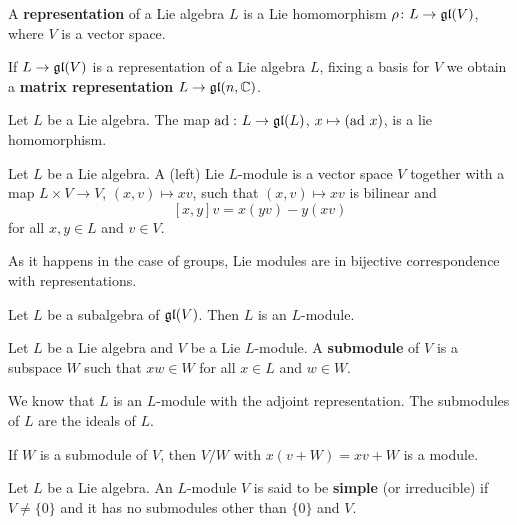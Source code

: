 
\begin{definition}
    A \textbf{representation} of a Lie algebra $L$ 
    is a Lie homomorphism $\rho\colon L\to\mathfrak{gl}(V)$, where $V$ is a vector space. 
\end{definition}

If $L\to\mathfrak{gl}(V)$ is a representation of a Lie algebra $L$, 
fixing a basis for $V$ 
we obtain a \textbf{matrix representation}
$L\to\mathfrak{gl}(n,\mathbb{C})$. 

\begin{example}
    Let $L$ be a Lie algebra. 
    The map $\operatorname{ad}\,\colon L\to\mathfrak{gl}(L)$, $x\mapsto (\operatorname{ad}\,x)$, is a lie 
    homomorphism. 
\end{example}

\begin{definition}
Let $L$ be a Lie algebra. 
A (left) Lie $L$-module is a vector space $V$ 
together with a map $L\times V\to V$, $(x,v)\mapsto xv$, 
such that $(x,v)\mapsto xv$ is bilinear 
and 
\[
    [x,y]v=x(yv)-y(xv)
\]
for all $x,y\in L$ and $v\in V$. 
\end{definition}

As it happens in the case of groups, Lie modules are
in bijective correspondence with representations. 

\begin{example}
    Let $L$ be a subalgebra of $\mathfrak{gl}(V)$. Then 
    $L$ is an $L$-module. 
\end{example}

\begin{definition}
    Let $L$ be a Lie algebra and $V$ be a Lie $L$-module. 
    A \textbf{submodule} of $V$ is a subspace $W$ 
    such that $xw\in W$ for all $x\in L$ and $w\in W$. 
\end{definition}

\begin{example}
We know that $L$ is an $L$-module 
with the adjoint representation. The submodules of $L$ are
the ideals of $L$. 
\end{example}

If $W$ is a submodule of $V$, then $V/W$ 
with $x(v+W)=xv+W$ is a module. 

\begin{definition}
    Let $L$ be a Lie algebra. An $L$-module $V$ 
    is said to be \textbf{simple} (or irreducible) 
    if $V\ne \{0\}$ and it has no submodules other than $\{0\}$ and $V$. 
\end{definition}

